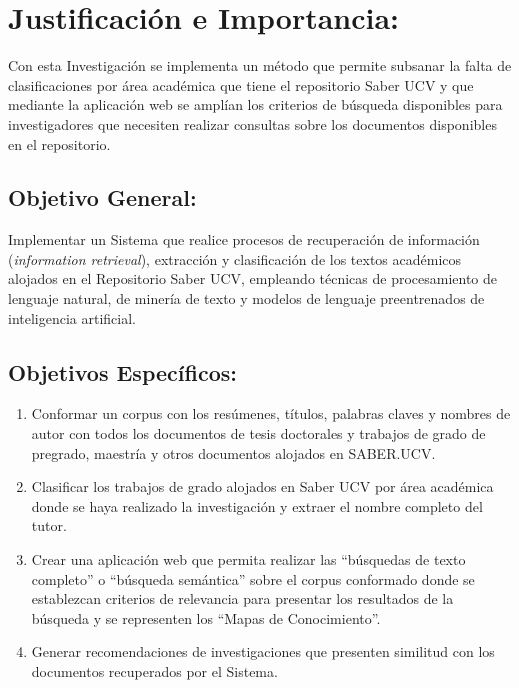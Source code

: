 \documentclass[
  12pt,
  openany]{book}
\begin{document}
\hypertarget{justificacion}{%
\section{Justificación e Importancia:}\label{justificacion}}

Con esta Investigación se implementa un método que permite subsanar la falta de clasificaciones por área académica que tiene el repositorio Saber UCV y que mediante la aplicación web se amplían los criterios de búsqueda disponibles para investigadores que necesiten realizar consultas sobre los documentos disponibles en el repositorio.

\hypertarget{objegeneral}{%
\subsection{Objetivo General:}\label{objegeneral}}

Implementar un Sistema que realice procesos de recuperación de información (\emph{information retrieval}), extracción y clasificación de los textos académicos alojados en el Repositorio Saber UCV, empleando técnicas de procesamiento de lenguaje natural, de minería de texto y modelos de lenguaje preentrenados de inteligencia artificial.

\hypertarget{objeespe}{%
\subsection{Objetivos Específicos:}\label{objeespe}}

\begin{enumerate}
\def\labelenumi{\arabic{enumi}.}
\item
  Conformar un corpus con los resúmenes, títulos, palabras claves y nombres de autor con todos los documentos de tesis doctorales y trabajos de grado de pregrado, maestría y otros documentos alojados en SABER.UCV.
\item
  Clasificar los trabajos de grado alojados en Saber UCV por área académica donde se haya realizado la investigación y extraer el nombre completo del tutor.
\item
  Crear una aplicación web que permita realizar las ``búsquedas de texto completo'' o ``búsqueda semántica'' sobre el corpus conformado donde se establezcan criterios de relevancia para presentar los resultados de la búsqueda y se representen los ``Mapas de Conocimiento''.
\item
  Generar recomendaciones de investigaciones que presenten similitud con los documentos recuperados por el Sistema.
\end{enumerate}
\end{document}
